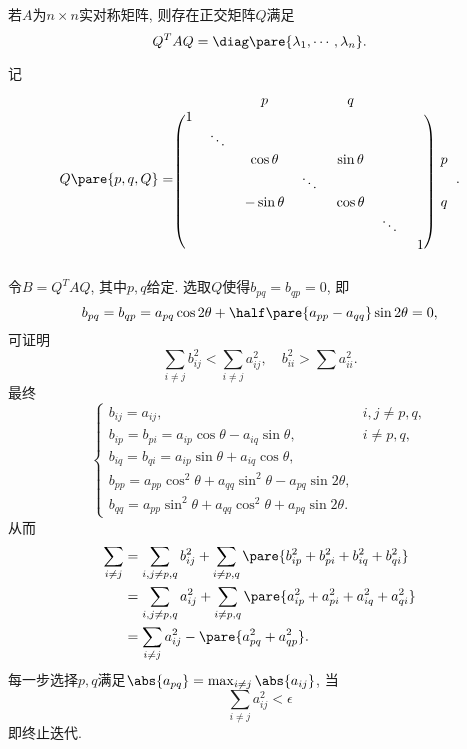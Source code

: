 \documentclass[hidelinks]{ctexart}
\begin{document}
\begin{theorem}
    若$A$为$n\times n$实对称矩阵, 则存在正交矩阵$Q$满足
    \[ Q^TAQ = \diag\pare{\lambda_1,\cdots,\lambda_n}. \]
\end{theorem}
记
\[ Q\pare{p,q,Q} = \begin{blockarray}{cccccccc}
& & p & & q\\
\begin{block}{(ccccccc)c}
    1 & & & & & & \\
    & \ddots \\
    & & \cos\theta & & \sin \theta & & &p \\
    & & & \ddots \\
    & & -\sin\theta & & \cos\theta & & & q \\
    & & & & & \ddots \\
    & & & & & & 1 \\
\end{block}
\end{blockarray}. \]
令$B = Q^T AQ$, 其中$p,q$给定. 选取$Q$使得$b_{pq} = b_{qp} = 0$, 即
\[ b_{pq} = b_{qp} = a_{pq}\cos 2\theta + \half \pare{a_{pp} - a_{qq}}\sin 2\theta = 0, \]
可证明
\[ \sum_{i\neq j} b_{ij}^2 < \sum_{i\neq j}a_{ij}^2,\quad b_{ii}^2 > \sum a_{ii}^2. \]
最终
\[ \begin{cases}
    b_{ij} = a_{ij}, & i,j\neq p,q, \\
    b_{ip} = b_{pi} = a_{ip}\cos\theta - a_{iq}\sin\theta,& i\neq p,q, \\
    b_{iq} = b_{qi} = a_{ip}\sin\theta + a_{iq}\cos\theta,\\
    b_{pp} = a_{pp}\cos^2\theta + a_{qq}\sin^2\theta - a_{pq}\sin 2\theta, \\
    b_{qq} = a_{pp}\sin^2\theta + a_{qq}\cos^2\theta + a_{pq}\sin 2\theta.
\end{cases} \]
从而
\begin{align*}
    \sum_{i\neq j} &= \sum_{i,j \neq p,q} b_{ij}^2 + \sum_{i\neq p,q} \pare{b_{ip}^2 + b_{pi}^2 + b_{iq}^2 + b_{qi}^2} \\
    &=\sum_{i,j\neq p,q} a_{ij}^2 + \sum_{i\neq p,q} \pare{a_{ip}^2 + a_{pi}^2 + a_{iq}^2 + a_{qi}^2} \\
    &= \sum_{i\neq j} a_{ij}^2 - \pare{a_{pq}^2 + a_{qp}^2}.
\end{align*}
每一步选择$p,q$满足$\abs{a_{pq}} = \max_{i\neq j}\abs{a_{ij}}$, 当
\[ \sum_{i\neq j} a_{ij}^2 < \epsilon \]
即终止迭代.


\end{document}
